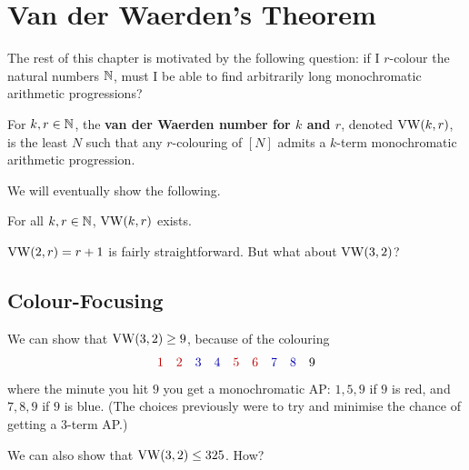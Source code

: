 \section{Van der Waerden's Theorem}

The rest of this chapter is motivated by the following question: if I $r$-colour the natural numbers $\mathbb{N}$, must I be able to find arbitrarily long monochromatic arithmetic progressions?

\begin{boxdefinition}
    For $k, r \in \mathbb{N}$, the \textbf{van der Waerden number for $k$ and $r$}, denoted $\operatorname{VW}(k, r)$, is the least $N$ such that any $r$-colouring of $[N]$ admits a $k$-term monochromatic arithmetic progression.
\end{boxdefinition}

We will eventually show the following.

\begin{boxtheorem} \label{Ch6:Thm:Van_Der_Waerden}
    For all $k, r \in \mathbb{N}$, $\operatorname{VW}(k, r)$ exists.
\end{boxtheorem}

$\operatorname{VW}(2, r) = r + 1$ is fairly straightforward. But what about $\operatorname{VW}(3, 2)$?

\subsection{Colour-Focusing}

We can show that $\operatorname{VW}(3, 2) \geq 9$, because of the colouring
\begin{align*}
    \textcolor{red!75!black}{1} \quad \textcolor{red!75!black}{2} \quad \textcolor{blue!70!black}{3} \quad \textcolor{blue!70!black}{4} \quad \textcolor{red!75!black}{5} \quad \textcolor{red!75!black}{6} \quad \textcolor{blue!70!black}{7} \quad \textcolor{blue!70!black}{8} \quad 9
\end{align*}
where the minute you hit $9$ you get a monochromatic AP: $1, 5, 9$ if $9$ is red, and $7, 8, 9$ if $9$ is blue. (The choices previously were to try and minimise the chance of getting a $3$-term AP.)

We can also show that $\operatorname{VW}(3, 2) \leq 325$. How?

